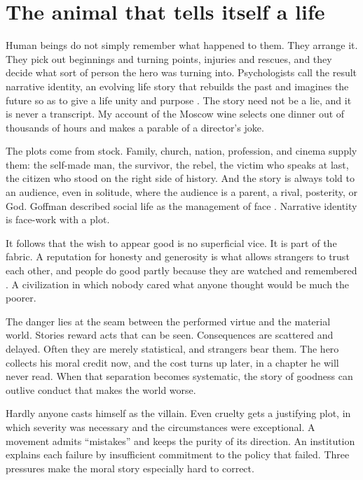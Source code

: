 \documentclass[12pt,a4paper]{book}
\begin{document}
\section{The animal that tells itself a life}

Human beings do not simply remember what happened to them. They arrange it. They pick out beginnings and turning points, injuries and rescues, and they decide what sort of person the hero was turning into. Psychologists call the result narrative identity, an evolving life story that rebuilds the past and imagines the future so as to give a life unity and purpose \cite{McAdamsMcLean2013}. The story need not be a lie, and it is never a transcript. My account of the Moscow wine selects one dinner out of thousands of hours and makes a parable of a director's joke.

The plots come from stock. Family, church, nation, profession, and cinema supply them: the self-made man, the survivor, the rebel, the victim who speaks at last, the citizen who stood on the right side of history. And the story is always told to an audience, even in solitude, where the audience is a parent, a rival, posterity, or God. Goffman described social life as the management of face \cite{goffman1967}. Narrative identity is face-work with a plot.

It follows that the wish to appear good is no superficial vice. It is part of the fabric. A reputation for honesty and generosity is what allows strangers to trust each other, and people do good partly because they are watched and remembered \cite{WuBallietVanLange2016}. A civilization in which nobody cared what anyone thought would be much the poorer.

The danger lies at the seam between the performed virtue and the material world. Stories reward acts that can be seen. Consequences are scattered and delayed. Often they are merely statistical, and strangers bear them. The hero collects his moral credit now, and the cost turns up later, in a chapter he will never read. When that separation becomes systematic, the story of goodness can outlive conduct that makes the world worse.

Hardly anyone casts himself as the villain. Even cruelty gets a justifying plot, in which severity was necessary and the circumstances were exceptional. A movement admits ``mistakes'' and keeps the purity of its direction. An institution explains each failure by insufficient commitment to the policy that failed. Three pressures make the moral story especially hard to correct.
\end{document}
